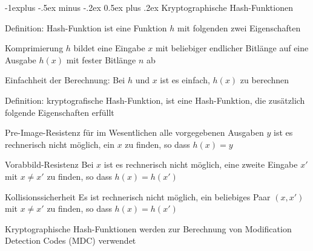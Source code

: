 \documentclass[a4paper]{article}
\makeatletter
\renewcommand{\subsection}{\@startsection{subsection}{2}{0mm}%
 {-1explus -.5ex minus -.2ex}%
 {0.5ex plus .2ex}%
 {\normalfont\normalsize\bfseries}}
\makeatother
\begin{document}
\begin{multicols}{3}
      \subsection{Kryptographische Hash-Funktionen}
      \begin{itemize*}
            \item Definition: Hash-Funktion ist eine Funktion $h$ mit folgenden zwei Eigenschaften
            \begin{description*}
                  \item[Komprimierung] $h$ bildet eine Eingabe $x$ mit beliebiger endlicher Bitlänge auf eine Ausgabe $h(x)$ mit fester Bitlänge $n$ ab
                  \item[Einfachheit] der Berechnung: Bei $h$ und $x$ ist es einfach, $h(x)$ zu berechnen
            \end{description*}
            \item Definition: kryptografische Hash-Funktion, ist eine Hash-Funktion, die zusätzlich folgende Eigenschaften erfüllt
            \begin{description*}
                  \item[Pre-Image-Resistenz] für im Wesentlichen alle vorgegebenen Ausgaben $y$ ist es rechnerisch nicht möglich, ein $x$ zu finden, so dass $h(x)=y$
                  \item[Vorabbild-Resistenz] Bei $x$ ist es rechnerisch nicht möglich, eine zweite Eingabe $x'$ mit $x\not= x'$ zu finden, so dass $h(x)=h(x')$
                  \item[Kollisionssicherheit] Es ist rechnerisch nicht möglich, ein beliebiges Paar $(x,x')$ mit $x\not= x'$ zu finden, so dass $h(x)=h(x')$
            \end{description*}
            \item Kryptographische Hash-Funktionen werden zur Berechnung von Modification Detection Codes (MDC) verwendet
      \end{itemize*}


\end{multicols}
\end{document}

